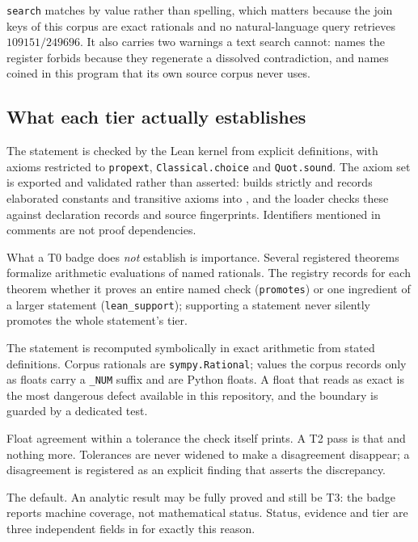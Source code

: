 \texttt{search} matches by value rather than spelling, which matters
because the join keys of this corpus are exact rationals and no
natural-language query retrieves $109151/249696$. It also carries two
warnings a text search cannot: names the register forbids because they
regenerate a dissolved contradiction, and names coined in this program
that its own source corpus never uses.

\subsection{What each tier actually establishes}

\begin{description}[leftmargin=1.2em,style=nextline]
\item[\Tzero{} --- Lean 4, no \texttt{sorry}.]
  The statement is checked by the Lean kernel from explicit definitions,
  with axioms restricted to \texttt{propext}, \texttt{Classical.choice}
  and \texttt{Quot.sound}. The axiom set is exported and validated rather
  than asserted:  builds
  strictly and records elaborated constants and transitive axioms into
  , and the loader checks these
  against declaration records and source fingerprints. Identifiers
  mentioned in comments are not proof dependencies.

  What a T0 badge does \emph{not} establish is importance. Several
  registered theorems formalize arithmetic evaluations of named
  rationals. The registry records for each theorem whether it proves an
  entire named check (\texttt{promotes}) or one ingredient of a larger
  statement (\texttt{lean\_support}); supporting a statement never
  silently promotes the whole statement's tier.

\item[\Tone{} --- exact re-derivation.]
  The statement is recomputed symbolically in exact arithmetic from
  stated definitions. Corpus rationals are \texttt{sympy.Rational};
  values the corpus records only as floats carry a \texttt{\_NUM} suffix
  and are Python floats. A float that reads as exact is the most
  dangerous defect available in this repository, and the boundary is
  guarded by a dedicated test.

\item[\Ttwo{} --- numerical agreement.]
  Float agreement within a tolerance the check itself prints. A T2 pass
  is that and nothing more. Tolerances are never widened to make a
  disagreement disappear; a disagreement is registered as an explicit
  finding that asserts the discrepancy.

\item[\Tthree{} --- no whole-statement machine certification.]
  The default. An analytic result may be fully proved and still be T3:
  the badge reports machine coverage, not mathematical status. Status,
  evidence and tier are three independent fields in
   for exactly this reason.
\end{description}

